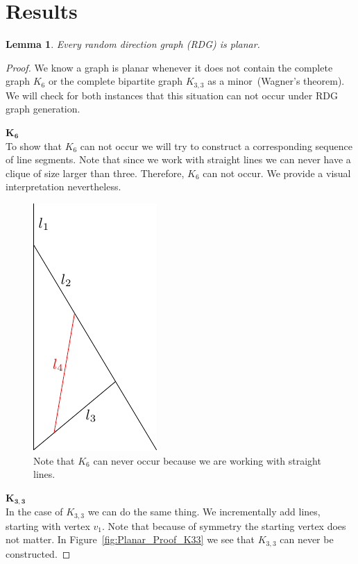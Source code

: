 \documentclass{article}
\newtheorem{lemma}{Lemma}
\theoremstyle{definition}
\theoremstyle{remark}
\begin{document}
\section{Results}

\begin{lemma}
    Every random direction graph (RDG) is planar. 
\end{lemma}
\begin{proof}
    We know a graph is planar whenever it does not contain the complete graph $K_6$ or the complete bipartite graph $K_{3,3}$ as a minor~(Wagner's theorem). We will check for both instances that this situation can not occur under RDG graph generation.

    $\mathbf{K_{6}}$ \\
    To show that $K_6$ can not occur we will try to construct a corresponding sequence of line segments. Note that since we work with straight lines we can never have a clique of size larger than three. Therefore, $K_6$ can not occur. We provide a visual interpretation nevertheless.
    \begin{figure}[h!]
        \centering
        \includegraphics{Figures/K6}
        
        \caption{Note that $K_6$ can never occur because we are working with straight lines.}\label{fig:Planar_Proof_K6}
    \end{figure}

    $\mathbf{K_{3,3}}$ \\
    In the case of $K_{3,3}$ we can do the same thing. We incrementally add lines, starting with vertex $v_1$. Note that because of symmetry the starting vertex does not matter. In Figure~\ref{fig:Planar_Proof_K33} we see that $K_{3,3}$ can never be constructed.


\end{proof}
\end{document}

